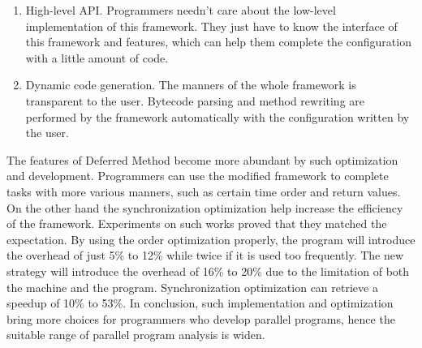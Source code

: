 \begin{englishabstract}
\begin{enumerate}
	\item High-level API. Programmers needn't care about the low-level implementation of this framework. They just have to know the interface of this framework and features, which can help them complete the configuration with a little amount of code.
	\item Dynamic code generation. The manners of the whole framework is transparent to the user. Bytecode parsing and method rewriting are performed by the framework automatically with the configuration written by the user.
\end{enumerate}

The features of Deferred Method become more abundant by such optimization and development. Programmers can use the modified framework to complete tasks with more various manners, such as certain time order and return values. On the other hand the synchronization optimization help increase the efficiency of the framework. Experiments on such works proved that they matched the expectation. By using the order optimization properly, the program will introduce the overhead of just 5\% to 12\% while twice if it is used too frequently. The new strategy will introduce the overhead of 16\% to 20\% due to the limitation of both the machine and the program. Synchronization optimization can retrieve a speedup of 10\% to 53\%. In conclusion, such implementation and optimization bring more choices for programmers who develop parallel programs, hence the suitable range of parallel program analysis is widen.

\end{englishabstract}
